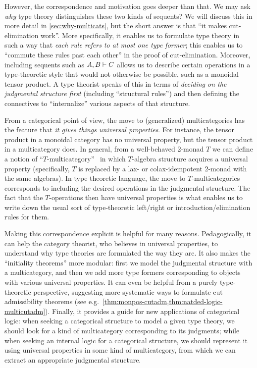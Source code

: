 However, the correspondence and motivation goes deeper than that.
We may ask \emph{why} type theory distinguishes these two kinds of sequents?
We will discuss this in more detail in \cref{sec:why-multicats}, but the short answer is that ``it makes cut-elimination work''.
More specifically, it enables us to formulate type theory in such a way that \emph{each rule refers to at most one type former}; this enables us to ``commute these rules past each other'' in the proof of cut-elimination.
Moreover, including sequents such as $A,B\vdash C$ allows us to describe certain operations in a type-theoretic style that would not otherwise be possible, such as a monoidal tensor product.
A type theorist speaks of this in terms of \emph{deciding on the judgmental structure first} (including ``structural rules'') and then defining the connectives to ``internalize'' various aspects of that structure.

From a categorical point of view, the move to (generalized) multicategories has the feature that \emph{it gives things universal properties}.
For instance, the tensor product in a monoidal category has no universal property, but the tensor product in a multicategory does.
In general, from a well-behaved 2-monad $T$ we can define a notion of ``$T$-multicategory''~\cite{burroni:t-cats,leinster:higher-opds,hermida:coh-univ,cs:multicats} in which $T$-algebra structure acquires a universal property (specifically, $T$ is replaced by a lax- or colax-idempotent 2-monad with the same algebras).
In type theoretic language, the move to $T$-multicategories corresponds to including the desired operations in the judgmental structure.
The fact that the $T$-operations then have universal properties is what enables us to write down the usual sort of type-theoretic left/right or introduction/elimination rules for them.

Making this correspondence explicit is helpful for many reasons.
Pedagogically, it can help the category theorist, who believes in universal properties, to understand why type theories are formulated the way they are.
It also makes the ``initiality theorems'' more modular: first we model the judgmental structure with a multicategory, and then we add more type formers corresponding to objects with various universal properties.
It can even be helpful from a purely type-theoretic perspective, suggesting more systematic ways to formulate cut admissibility theorems (see e.g.\ \cref{thm:monpos-cutadm,thm:natded-logic-multicutadm}). %
Finally, it provides a guide for new applications of categorical logic: when seeking a categorical structure to model a given type theory, we should look for a kind of multicategory corresponding to its judgments; while when seeking an internal logic for a categorical structure, we should represent it using universal properties in some kind of multicategory, from which we can extract an appropriate judgmental structure.

